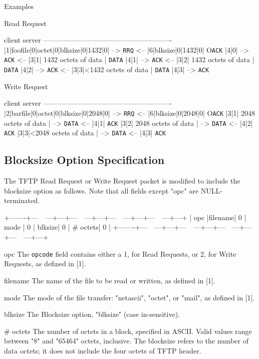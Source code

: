 \documentclass[12pt]{article}
\begin{document}
Examples

Read Request

   client                      server
   -------------------------------------------------------
   |1|foofile|0|octet|0|blksize|0|1432|0| -->        \verb|RRQ|
                  <-- |6|blksize|0|1432|0|  O\verb|ACK|
   |4|0| -->                        \verb|ACK|
               <-- |3|1| 1432 octets of data |  \verb|DATA|
   |4|1| -->                        \verb|ACK|
               <-- |3|2| 1432 octets of data |  \verb|DATA|
   |4|2| -->                        \verb|ACK|
               <-- |3|3|<1432 octets of data |  \verb|DATA|
   |4|3| -->                        \verb|ACK|

Write Request

   client                      server
   -------------------------------------------------------
   |2|barfile|0|octet|0|blksize|0|2048|0| -->        \verb|RRQ|
                  <-- |6|blksize|0|2048|0|  O\verb|ACK|
   |3|1| 2048 octets of data | -->             \verb|DATA|
                          <-- |4|1|  \verb|ACK|
   |3|2| 2048 octets of data | -->             \verb|DATA|
                          <-- |4|2|  \verb|ACK|
   |3|3|<2048 octets of data | -->             \verb|DATA|
                           <-- |4|3|  \verb|ACK|

\subsection{Blocksize Option Specification}
The TFTP Read Request or Write Request packet is modified to include
the blocksize option as follows. Note that all fields except "opc"
are NULL-terminated.

   +-------+---~~---+---+---~~---+---+---~~---+---+---~~---+---+
   | opc |filename| 0 | mode | 0 | blksize| 0 | \# octets| 0 |
   +-------+---~~---+---+---~~---+---+---~~---+---+---~~---+---+

   opc
     The \verb|opcode| field contains either a 1, for Read Requests, or 2,
     for Write Requests, as defined in [1].

   filename
     The name of the file to be read or written, as defined in [1].

   mode
     The mode of the file transfer: "netascii", "octet", or "mail",
     as defined in [1].

   blksize
     The Blocksize option, "blksize" (case in-sensitive).

   \# octets
     The number of octets in a block, specified in ASCII. Valid
     values range between "8" and "65464" octets, inclusive. The
     blocksize refers to the number of data octets; it does not
     include the four octets of TFTP header.
\end{document}
